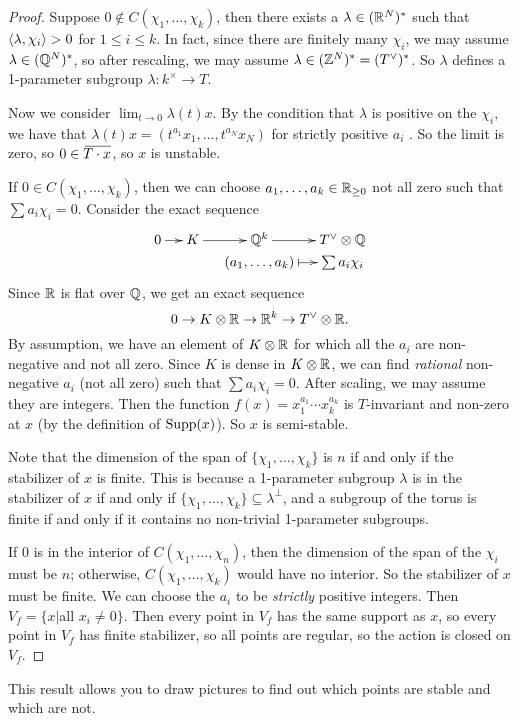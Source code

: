 \begin{proof}
 Suppose $0\not\in C(\chi_1,\dots, \chi_k)$, then there exists a $\lambda\in (\mathbb{R}^N)^*$ such that $\langle\lambda,\chi_i\rangle>0$ for $1\le i\le k$. In fact, since there are finitely many $\chi_i$, we may assume $\lambda\in (\mathbb{Q}^N)^*$, so after rescaling, we may assume $\lambda\in (\mathbb{Z}^N)^*=(T^\vee)^*$. So $\lambda$ defines a 1-parameter subgroup $\lambda\colon k^\times\to T$.
 
 Now we consider $\lim_{t\to 0} \lambda(t)x$. By the condition that $\lambda$ is positive on the $\chi_i$, we have that $\lambda(t)x=(t^{a_1}x_1,\dots, t^{a_N}x_N)$ for strictly positive $a_i$ . So the limit is zero, so $0\in \bbar{T\cdot x}$, so $x$ is unstable.
 
 If $0\in C(\chi_1,\dots, \chi_k)$, then we can choose $a_1,\dots, a_k\in \mathbb{R}_{\ge 0}$ not all zero such that $\sum a_i \chi_i=0$. Consider the exact sequence
 \[\xymatrix@R=0pc @C=1pc{
  0\ar[r]& K\ar[r]& \QQ^k\ar[r]& T^\vee\otimes\QQ\\
  & & (a_1,\dots, a_k)\ar@{|->}[r] & \sum a_i\chi_i
 }\]
 Since $\mathbb{R}$ is flat over $\mathbb{Q}$, we get an exact sequence
 \[
  0\to K\otimes \mathbb{R}\to \mathbb{R}^k\to T^\vee\otimes \mathbb{R}.
 \]
 By assumption, we have an element of $K\otimes \mathbb{R}$ for which all the $a_i$ are non-negative and not all zero. Since $K$ is dense in $K\otimes \mathbb{R}$, we can find \emph{rational} non-negative $a_i$ (not all zero) such that $\sum a_i\chi_i=0$. After scaling, we may assume they are integers. Then the function $f(x)=x_1^{a_1}\cdots x_k^{a_k}$ is $T$-invariant and non-zero at $x$ (by the definition of $\operatorname{Supp}(x)$). So $x$ is semi-stable.
 
 Note that the dimension of the span of $\{\chi_1,\dots, \chi_k\}$ is $n$ if and only if the stabilizer of $x$ is finite. This is because a 1-parameter subgroup $\lambda$ is in the stabilizer of $x$ if and only if $\{\chi_1,\dots, \chi_k\}\subseteq \lambda^\perp$, and a subgroup of the torus is finite if and only if it contains no non-trivial 1-parameter subgroups.
 
 If $0$ is in the interior of $C(\chi_1,\dots, \chi_n)$, then the dimension of the span of the $\chi_i$ must be $n$; otherwise, $C(\chi_1,\dots, \chi_k)$ would have no interior. So the stabilizer of $x$ must be finite. We can choose the $a_i$ to be \emph{strictly} positive integers. Then $V_f=\{x|$all $x_i\neq 0\}$. Then every point in $V_f$ has the same support as $x$, so every point in $V_f$ has finite stabilizer, so all points are regular, so the action is closed on $V_f$.
\end{proof}
This result allows you to draw pictures to find out which points are stable and which are not.

